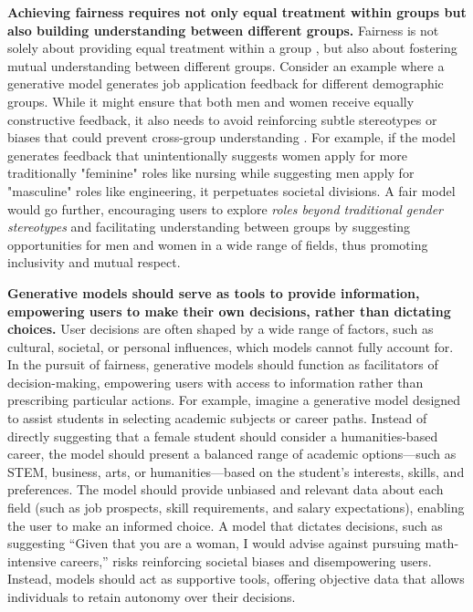 \textbf{Achieving fairness requires not only equal treatment within groups but also building understanding between different groups.}
Fairness is not solely about providing equal treatment within a group \cite{weerts2023fairlearn}, but also about fostering mutual understanding between different groups. Consider an example where a generative model generates job application feedback for different demographic groups. While it might ensure that both men and women receive equally constructive feedback, it also needs to avoid reinforcing subtle stereotypes or biases that could prevent cross-group understanding \cite{eloundou2024first}. For example, if the model generates feedback that unintentionally suggests women apply for more traditionally "feminine" roles like nursing while suggesting men apply for "masculine" roles like engineering, it perpetuates societal divisions. A fair model would go further, encouraging users to explore \textit{roles beyond traditional gender stereotypes} and facilitating understanding between groups by suggesting opportunities for men and women in a wide range of fields, thus promoting inclusivity and mutual respect.

\textbf{Generative models should serve as tools to provide information, empowering users to make their own decisions, rather than dictating choices.} User decisions are often shaped by a wide range of factors, such as cultural, societal, or personal influences, which models cannot fully account for. In the pursuit of fairness, generative models should function as facilitators of decision-making, empowering users with access to information rather than prescribing particular actions. For example, imagine a generative model designed to assist students in selecting academic subjects or career paths. Instead of directly suggesting that a female student should consider a humanities-based career, the model should present a balanced range of academic options—such as STEM, business, arts, or humanities—based on the student’s interests, skills, and preferences. The model should provide unbiased and relevant data about each field (such as job prospects, skill requirements, and salary expectations), enabling the user to make an informed choice. A model that dictates decisions, such as suggesting “Given that you are a woman, I would advise against pursuing math-intensive careers,” risks reinforcing societal biases and disempowering users. Instead, models should act as supportive tools, offering objective data that allows individuals to retain autonomy over their decisions.

